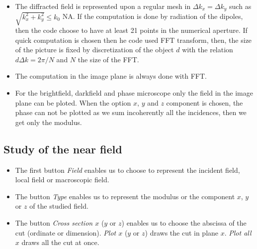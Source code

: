 \begin{itemize}


\item The diffracted field is represented upon a regular mesh in
  $\Delta k_x=\Delta k_y$ such as $\sqrt{k_x^2+k_y^2} \le k_0$ NA. If
  the computation is done by radiation of the dipoles, then the code
  choose to have at least 21 points in the numerical aperture.  If
  quick computation is chosen then he code used FFT transform, then,
  the size of the picture is fixed by discretization of the object $d$
  with the relation $d \Delta k=2\pi/N$ and $N$ the size of the FFT.

  \item The computation in the image plane is always done with FFT.


\item For the brightfield, darkfield and phase microscope only the
  field in the image plane can be ploted. When the option $x$, $y$ and
  $z$ component is chosen, the phase can not be plotted as we sum
  incoherently all the incidences, then we get only the modulus.


\end{itemize}


\subsection{Study of the near field}

\begin{itemize}

\item The first button {\it Field} enables us to choose to represent
  the incident field, local field or macroscopic field.

\item The button {\it Type} enables us to represent the modulus or the 
component $x$, $y$ or $z$ of the studied field.

\item The button {\it Cross section $x$} ($y$ or $z$) enables us to
  choose the abscissa of the cut (ordinate or dimension). {\it Plot
    $x$} ($y$ or $z$) draws the cut in plane $x$. {\it Plot all $x$}
  draws all the cut at once.

\end{itemize}


